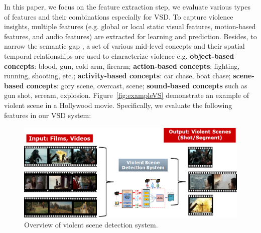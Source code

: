\documentclass[twocolumn]{bmcart}%
\begin{document}
In this paper, we focus on the feature extraction step, we evaluate various types of features and their combinations especially for VSD. To capture violence insights, multiple features \cite{demarty2014benchmarking} (e.g. global or local static visual features, motion-based features, and audio features) are extracted for learning and prediction. Besides, to narrow the semantic gap \cite{SemanticGap}, a set of various mid-level concepts \cite{Concepts} and their spatial temporal relationships are used to characterize violence e.g. {\bf object-based concepts}: blood,  gun, cold arm, firearm; {\bf action-based concepts}: fighting, running, shooting, etc.; {\bf activity-based concepts}: car chase, boat chase; {\bf scene-based concepts}: gory scene, overcast, scene; {\bf sound-based concepts} such as gun shot, scream, explosion. Figure~\ref{fig:exampleVS} demonstrate an example of violent scene in a Hollywood movie. Specifically, we evaluate the following features in our VSD system:
\begin{figure}[!t]
	\centering
	\includegraphics[width=2\linewidth]{Images/SystemOverview.png}
	\caption{Overview of violent scene detection system.}
	\label{fig:systemoverview}
\end{figure}
\end{document}
